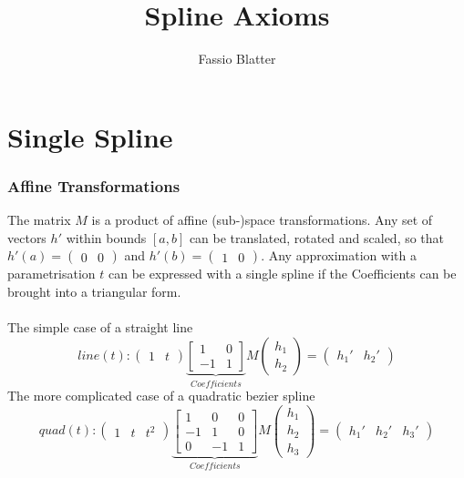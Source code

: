 \documentclass[a4paper,landscape]{report}
\begin{document}
\title{Spline Axioms}
\author{Fassio Blatter}
\maketitle

\chapter{Single Spline}

\subsection{Affine Transformations}
The matrix $M$ is a product of affine (sub-)space transformations. Any set of vectors $h'$ within bounds $[a,b]$ can be translated, rotated and scaled, so that $h'(a)=\begin{pmatrix}0 & 0\end{pmatrix}$ and $h'(b)=\begin{pmatrix}1 & 0\end{pmatrix}$. Any approximation with a parametrisation $t$ can be expressed with a single spline if the Coefficients can be brought into a triangular form.\\\\
The simple case of a straight line
\begin{equation}
line(t):
\begin{pmatrix}
1 & t
\end{pmatrix}
\underbrace{\begin{bmatrix}
1 & 0\\
-1 & 1
\end{bmatrix}}_{Coefficients}
M
\begin{pmatrix}
h_{1} \\
h_{2}
\end{pmatrix}
=
\begin{pmatrix}
h_{1}' & h_{2}'
\end{pmatrix}
\end{equation}
The more complicated case of a quadratic bezier spline
\begin{equation}
quad(t):
\begin{pmatrix}
1 & t & t^2
\end{pmatrix}
\underbrace{\begin{bmatrix}
1 & 0 & 0\\
-1 & 1 & 0\\
0 & -1 &1
\end{bmatrix}}_{Coefficients}
M
\begin{pmatrix}
h_{1} \\
h_{2} \\
h_{3}
\end{pmatrix}
=
\begin{pmatrix}
h_{1}' & h_{2}' & h_{3}'
\end{pmatrix}
\end{equation}
\end{document}
